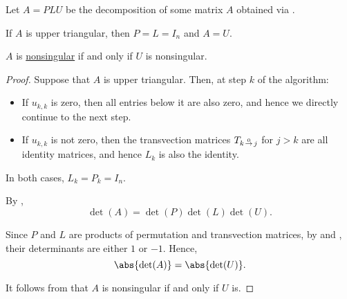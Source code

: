 \begin{proposition}\label{thm:alg:plu_decomposition}
  Let \( A = PLU \) be the decomposition of some matrix \( A \) obtained via .

  \begin{thmenum}
     If \( A \) is upper triangular, then \( P = L = I_n \) and \( A = U \).

     \( A \) is \hyperref[def:inverse_matrix]{nonsingular} if and only if \( U \) is nonsingular.
  \end{thmenum}
\end{proposition}
\begin{proof}
   Suppose that \( A \) is upper triangular. Then, at step \( k \) of the algorithm:
  \begin{itemize}
     \item If \( u_{k,k} \) is zero, then all entries below it are also zero, and hence we directly continue to the next step.
     \item If \( u_{k,k} \) is not zero, then the transvection matrices \( T_{k \reloset 0 \to j} \) for \( j > k \) are all identity matrices, and hence \( L_k \) is also the identity.
  \end{itemize}

  In both cases, \( L_k = P_k = I_n \).

   By ,
  \begin{equation*}
    \det(A) = \det(P) \det(L) \det(U).
  \end{equation*}

  Since \( P \) and \( L \) are products of permutation and transvection matrices, by  and , their determinants are either \( 1 \) or \( -1 \). Hence,
  \begin{equation*}
    \abs{\det(A)} = \abs{\det(U)}.
  \end{equation*}

  It follows from  that \( A \) is nonsingular if and only if \( U \) is.
\end{proof}

